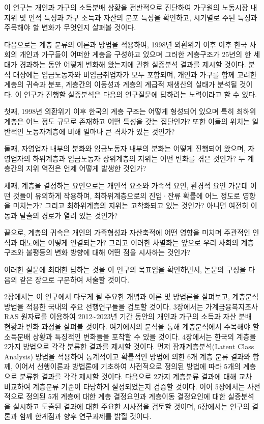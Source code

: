 \documentclass[
  letterpaper,
  DIV=11,
  numbers=noendperiod]{scrartcl}
\begin{document}
이 연구는 개인과 가구의 소득분배 상황을 전반적으로 진단하여 가구원의
노동시장 내 지위 및 인적 특성과 가구 소득과 자산의 분포 특성을 확인하고,
시기별로 주된 특징과 주목해야 할 변화가 무엇인지 살펴볼 것이다.

다음으로는 계층 분류의 이론과 방법을 적용하여, 1998년 외환위기 이후 이후
한국 사회의 개인과 가구들이 어떠한 계층을 구성하고 있으며 그러한
계층구조가 25년의 한 세대가 경과하는 동안 어떻게 변화해 왔는지에 관한
실증분석 결과를 제시할 것이다. 분석 대상에는 임금노동자와 비임금취업자가
모두 포함되며, 개인과 가구를 함께 고려한 계층의 귀속과 분포, 계층간의
이동성과 계층의 계급적 재생산의 실태가 분석될 것이다. 이 연구가 진행할
실증분석은 다음의 연구질문에 답하려는 노력이라고 할 수 있다.

첫째, 1998년 외환위기 이후 한국의 계층 구조는 어떻게 형성되어 있으며
특히 최하위계층은 어느 정도 규모로 존재하고 어떤 특성을 갖는 집단인가?
또한 이들의 위치는 일반적인 노동자계층에 비해 얼마나 큰 격차가 있는
것인가?

둘째, 자영업자 내부의 분화와 임금노동자 내부의 분화는 어떻게 진행되어
왔으며, 자영업자의 하위계층과 임금노동자 상위계층의 지위는 어떤 변화를
겪은 것인가? 두 계층간의 지위 역전은 언제 어떻게 발생한 것인가?

세째, 계층을 결정하는 요인으로는 개인적 요소와 가족적 요인, 환경적 요인
가운데 어떤 것들이 유의하게 작용하며, 최하위계층으로의 진입·잔류 확률에
어느 정도로 영향을 미치는가? 그리고 최하위계층의 지위는 고착화되고 있는
것인가? 아니면 여전히 이동과 탈출의 경로가 열려 있는 것인가?

끝으로, 계층의 귀속은 개인의 가족형성과 자산축적에 어떤 영향을 미치며
주관적인 인식과 태도에는 어떻게 연결되는가? 그리고 이러한 차별화는
앞으로 우리 사회의 계층구조와 불평등의 변화 방향에 대해 어떤 점을
시사하는 것인가?

이러한 질문에 최대한 답하는 것을 이 연구의 목표임을 확인하면서, 논문의
구성을 다음의 같은 장으로 구분하여 서술할 것이다.

2장에서는 이 연구에서 다루게 될 주요한 개념과 이론 및 방법론을 살펴보고,
계층분석 방법을 적용한 국내의 주요 선행연구들을 검토할 것이다. 3장에서는
가계금융복지조사 RAS 원자료를 이용하여 2012\textasciitilde2023년 기간
동안의 개인과 가구의 소득과 자산 분배 현황과 변화 과정을 살펴볼 것이다.
여기에서의 분석을 통해 계층분석에서 주목해야 할 소득분배 상황과 특징적인
변화들을 포착할 수 있을 것이다. 4장에서는 한국의 계층을 2가지 방법으로
각각 분류한 결과를 제시할 것이다. 먼저 잠재계층분석(Latent Class
Analysis) 방법을 적용하여 통계적이고 확률적인 방법에 의한 6개 계층 분류
결과와 함께, 이어서 선행이론과 방법론에 기초하여 사전적으로 정의된
방법에 따라 5개의 계층으로 분류한 결과를 각각 제시할 것이다. 다음으로
2가지 계층분류 결과에 대해 교차 비교하여 계층분류 기준이 타당하게
설정되었는지 검증할 것이다. 이어 5장에서는 사전적으로 정의된 5개 계층에
대한 계층 결정요인과 계층이동 결정요인에 대한 실증분석을 실시하고 도출된
결과에 대한 주요한 시사점을 검토할 것이며, 6장에서는 연구의 결론과 함께
한계점과 향후 연구과제를 밝힐 것이다.
\end{document}
